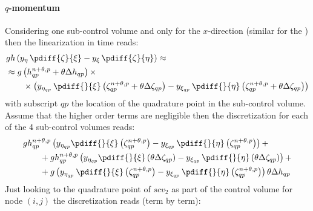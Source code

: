 \paragraph*{$q$-momentum}\label{sec:pressure_gradient_q}
Considering one sub-control volume and only for the $x$-direction (similar for the ) then the linearization in time reads:
\begin{align}
    & g h \left( y_{\eta}\, \pdiff{\zeta}{\xi} - y_{\xi}\, \pdiff{\zeta}{\eta} \right) \approx
    \\
   & \approx g \left( h^{n+\theta,p}_{qp} + \theta \Delta h_{qp}\right)  \times
   \\*
   & \qquad \times \left( y_{\eta_{qp}}\, \pdiff{}{\xi}\left(\zeta^{n+\theta,p}_{qp} + \theta \Delta \zeta_{qp} \right)
 - y_{\xi_{qp}}\, \pdiff{}{\eta}\left(\zeta^{n+\theta,p}_{qp} + \theta \Delta \zeta_{qp}   \right)
   \right)
\end{align}
with subscript $qp$ the location of the quadrature point in the sub-control volume.
Assume that the higher order terms are negligible then the discretization for each of the 4 sub-control volumes reads:
%
\begin{align}
&g h^{n+\theta,p}_{qp} \left( y_{\eta_{qp}}\pdiff{}{\xi}\left( \zeta^{n+\theta,p}_{qp} \right)
- y_{\xi_{qp}}\, \pdiff{}{\eta}\left(\zeta^{n+\theta,p}_{qp} \right) \right) +
\\
&\qquad + g h^{n+\theta,p}_{qp} \left( y_{\eta_{qp}}\pdiff{}{\xi}\left(\theta\Delta \zeta_{qp}\right)
- y_{\xi_{qp}}\, \pdiff{}{\eta} \left(\theta\Delta\zeta_{qp} \right)
\right) +
\\
&\qquad + g
\left( y_{\eta_{qp}}\, \pdiff{}{\xi}\left(\zeta^{n+\theta,p}_{qp} \right)
 - y_{\xi_{qp}}\, \pdiff{}{\eta}\left(\zeta^{n+\theta,p}_{qp} \right)
\right)\theta \Delta h_{qp}
\end{align}
Just looking to the quadrature point of $scv_2$ as part of the control volume for node $(i,j)$ the discretization reads (term by term):
